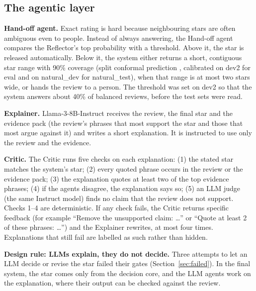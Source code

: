 \documentclass[runningheads]{llncs}
\begin{document}
\subsection{The agentic layer}

\textbf{Hand-off agent.} Exact rating is hard because neighbouring stars are often ambiguous even to people. Instead of always answering, the Hand-off agent compares the Reflector's top probability with a threshold. Above it, the star is released automatically. Below it, the system either returns a short, contiguous star range with 90\% coverage (split conformal prediction \cite{angelopoulos2021conformal}, calibrated on dev2 for eval and on natural\_dev for natural\_test), when that range is at most two stars wide, or hands the review to a person. The threshold was set on dev2 so that the system answers about 40\% of balanced reviews, before the test sets were read.

\textbf{Explainer.} Llama-3-8B-Instruct receives the review, the final star and the evidence pack (the review's phrases that most support the star and those that most argue against it) and writes a short explanation. It is instructed to use only the review and the evidence.

\textbf{Critic.} The Critic runs five checks on each explanation: (1) the stated star matches the system's star; (2) every quoted phrase occurs in the review or the evidence pack; (3) the explanation quotes at least two of the top evidence phrases; (4) if the agents disagree, the explanation says so; (5) an LLM judge (the same Instruct model) finds no claim that the review does not support. Checks 1--4 are deterministic. If any check fails, the Critic returns specific feedback (for example ``Remove the unsupported claim: \ldots'' or ``Quote at least 2 of these phrases: \ldots'') and the Explainer rewrites, at most four times. Explanations that still fail are labelled as such rather than hidden.

\textbf{Design rule: LLMs explain, they do not decide.} Three attempts to let an LLM decide or revise the star failed their gates (Section~\ref{sec:failed}). In the final system, the star comes only from the decision core, and the LLM agents work on the explanation, where their output can be checked against the review.
\end{document}

